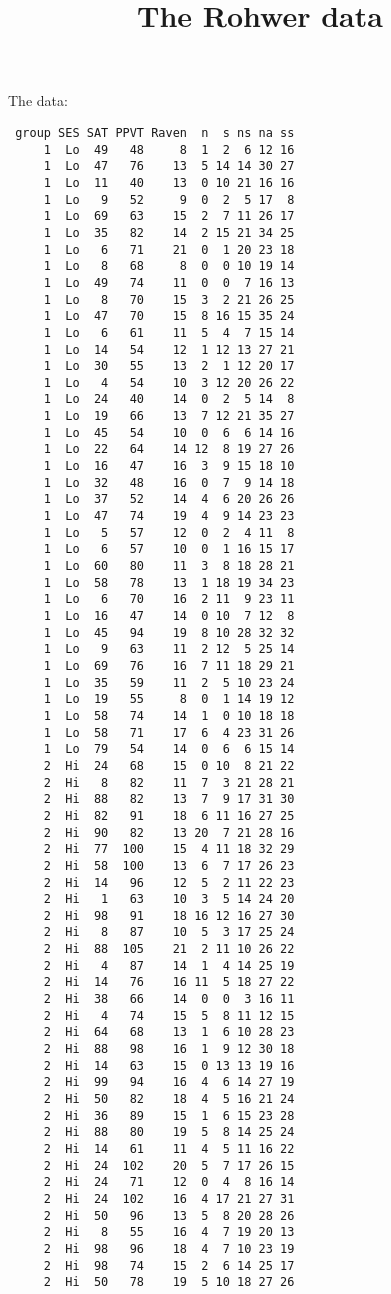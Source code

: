 \documentclass{article}
\title{The Rohwer data}
\begin{document}
\maketitle
The data:
\begin{verbatim}
 group SES SAT PPVT Raven  n  s ns na ss
     1  Lo  49   48     8  1  2  6 12 16
     1  Lo  47   76    13  5 14 14 30 27
     1  Lo  11   40    13  0 10 21 16 16
     1  Lo   9   52     9  0  2  5 17  8
     1  Lo  69   63    15  2  7 11 26 17
     1  Lo  35   82    14  2 15 21 34 25
     1  Lo   6   71    21  0  1 20 23 18
     1  Lo   8   68     8  0  0 10 19 14
     1  Lo  49   74    11  0  0  7 16 13
     1  Lo   8   70    15  3  2 21 26 25
     1  Lo  47   70    15  8 16 15 35 24
     1  Lo   6   61    11  5  4  7 15 14
     1  Lo  14   54    12  1 12 13 27 21
     1  Lo  30   55    13  2  1 12 20 17
     1  Lo   4   54    10  3 12 20 26 22
     1  Lo  24   40    14  0  2  5 14  8
     1  Lo  19   66    13  7 12 21 35 27
     1  Lo  45   54    10  0  6  6 14 16
     1  Lo  22   64    14 12  8 19 27 26
     1  Lo  16   47    16  3  9 15 18 10
     1  Lo  32   48    16  0  7  9 14 18
     1  Lo  37   52    14  4  6 20 26 26
     1  Lo  47   74    19  4  9 14 23 23
     1  Lo   5   57    12  0  2  4 11  8
     1  Lo   6   57    10  0  1 16 15 17
     1  Lo  60   80    11  3  8 18 28 21
     1  Lo  58   78    13  1 18 19 34 23
     1  Lo   6   70    16  2 11  9 23 11
     1  Lo  16   47    14  0 10  7 12  8
     1  Lo  45   94    19  8 10 28 32 32
     1  Lo   9   63    11  2 12  5 25 14
     1  Lo  69   76    16  7 11 18 29 21
     1  Lo  35   59    11  2  5 10 23 24
     1  Lo  19   55     8  0  1 14 19 12
     1  Lo  58   74    14  1  0 10 18 18
     1  Lo  58   71    17  6  4 23 31 26
     1  Lo  79   54    14  0  6  6 15 14
     2  Hi  24   68    15  0 10  8 21 22
     2  Hi   8   82    11  7  3 21 28 21
     2  Hi  88   82    13  7  9 17 31 30
     2  Hi  82   91    18  6 11 16 27 25
     2  Hi  90   82    13 20  7 21 28 16
     2  Hi  77  100    15  4 11 18 32 29
     2  Hi  58  100    13  6  7 17 26 23
     2  Hi  14   96    12  5  2 11 22 23
     2  Hi   1   63    10  3  5 14 24 20
     2  Hi  98   91    18 16 12 16 27 30
     2  Hi   8   87    10  5  3 17 25 24
     2  Hi  88  105    21  2 11 10 26 22
     2  Hi   4   87    14  1  4 14 25 19
     2  Hi  14   76    16 11  5 18 27 22
     2  Hi  38   66    14  0  0  3 16 11
     2  Hi   4   74    15  5  8 11 12 15
     2  Hi  64   68    13  1  6 10 28 23
     2  Hi  88   98    16  1  9 12 30 18
     2  Hi  14   63    15  0 13 13 19 16
     2  Hi  99   94    16  4  6 14 27 19
     2  Hi  50   82    18  4  5 16 21 24
     2  Hi  36   89    15  1  6 15 23 28
     2  Hi  88   80    19  5  8 14 25 24
     2  Hi  14   61    11  4  5 11 16 22
     2  Hi  24  102    20  5  7 17 26 15
     2  Hi  24   71    12  0  4  8 16 14
     2  Hi  24  102    16  4 17 21 27 31
     2  Hi  50   96    13  5  8 20 28 26
     2  Hi   8   55    16  4  7 19 20 13
     2  Hi  98   96    18  4  7 10 23 19
     2  Hi  98   74    15  2  6 14 25 17
     2  Hi  50   78    19  5 10 18 27 26
\end{verbatim}
\end{document}

